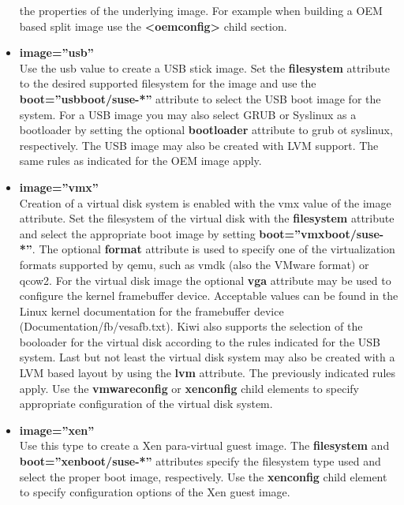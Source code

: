 \begin{itemize}
      the properties of the underlying image. For example when building a 
      OEM based split image use the \textbf{<oemconfig>} child section.
\item \textbf{image=''usb''}\\
      Use the usb value to create a USB stick image. Set the
      \textbf{filesystem} attribute to the desired supported filesystem for
      the image and use the \textbf{boot=''usbboot/suse-*''} attribute to
      select the USB boot image for the system. For a USB image you may
      also select GRUB or Syslinux as a bootloader by setting the
      optional \textbf{bootloader} attribute to grub ot syslinux,
      respectively. The USB image may also be created with LVM support.
      The same rules as indicated for the OEM image apply.
\item \textbf{image=''vmx''}\\
      Creation of a virtual disk system is enabled with the vmx value of
      the image attribute. Set the filesystem of the virtual disk with
      the \textbf{filesystem} attribute and select the appropriate boot
      image by setting \textbf{boot=''vmxboot/suse-*''}. The optional
      \textbf{format} attribute is used to specify one of the virtualization
      formats supported by qemu, such as vmdk (also the VMware format) or
      qcow2. For the virtual disk image the optional \textbf{vga} attribute
      may be used to configure the kernel framebuffer device. Acceptable
      values can be found in the Linux kernel documentation for the
      framebuffer device (Documentation/fb/vesafb.txt). Kiwi also supports
      the selection of the booloader for the virtual disk according to
      the rules indicated for the USB system. Last but not least
      the virtual disk system may also be created with a LVM based layout by
      using the \textbf{lvm} attribute. The previously indicated rules apply.
      Use the \textbf{vmwareconfig} or \textbf{xenconfig} child elements
      to specify appropriate configuration of the virtual disk system.
\item \textbf{image=''xen''}\\
      Use this type to create a Xen para-virtual guest image. The
      \textbf{filesystem} and \textbf{boot=''xenboot/suse-*''} attributes
      specify the filesystem type used and select the proper boot image,
      respectively. Use the \textbf{xenconfig} child element to specify
      configuration options of the Xen guest image.
\end{itemize}

